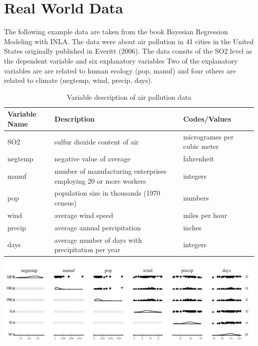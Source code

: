 \documentclass[11pt,a4paper,twoside]{book}\usepackage[]{graphicx}\usepackage[]{color}
\begin{document}
\section{Real World Data}


The following example data are taken from the book Bayesian Regression Modeling with INLA. The data were about air pollution in 41 cities in the United States originally published in Everitt (2006). The data consits of the SO2 level as the dependent variable and six explanatory variables 
Two of the explanatory variables are are related to human ecology (pop, manuf) and four others are related to climate (negtemp, wind, precip, days).


\begin{table}
\caption{Variable description of air pollution data}
\begin{tabularx}{\textwidth}{|l|X|l|}
  \hline			
  Variable Name & Description & Codes/Values \\   \hline  
  SO2 & sulfur dioxide content of air & microgrames per cubic meter \\
  negtemp & negative value of average & fahrenheit\\
  manuf & number of manufacturing enterprises employing 20 or more workers & integers \\
  pop & population size in thousands (1970 census) & numbers \\
  wind & average wind speed & miles per hour \\
  precip & average annual percipitation & inches \\
  days & average munber of days with precipitation per year & integers \\
  \hline  
\end{tabularx}
\label{table:airpollutiondata}
\end{table}



{\centering \includegraphics[width=\textwidth-3cm]{figure/ch03_figunnamed-chunk-4-1} 

}
\end{document}
